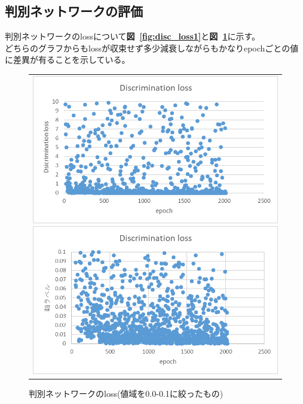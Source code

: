 \documentclass[a4j, 11pt]{jreport}
\newcommand{\figref}[1]{\textbf{図~\ref{#1}}}
\begin{document}
\subsection{判別ネットワークの評価}
判別ネットワークのlossについて\figref{fig:disc_loss1}と\figref{fig:disc_loss2}に示す。\\
どちらのグラフからもlossが収束せず多少減衰しながらもかなりepochごとの値に差異が有ることを示している。\\
\begin{figure}[H]
	\centering
	  \begin{tabular}{c}
		\begin{minipage}{0.50\hsize}
		  \centering
			\includegraphics[scale=0.5]
			{images/result/loss/discrimination_loss1(2).png}
			\caption{判別ネットワークのloss}
			\label{fig:disc_loss1}
		\end{minipage}
   
   
		\begin{minipage}{0.50\hsize}
		  \centering
			\includegraphics[scale=0.5]
							{images/result/loss/discrimination_loss2(2).png}
							\caption{判別ネットワークのloss(値域を0.0-0.1に絞ったもの)}
							\label{fig:disc_loss2}
		\end{minipage} \\
	\end{tabular}
\end{figure}
\end{document}
